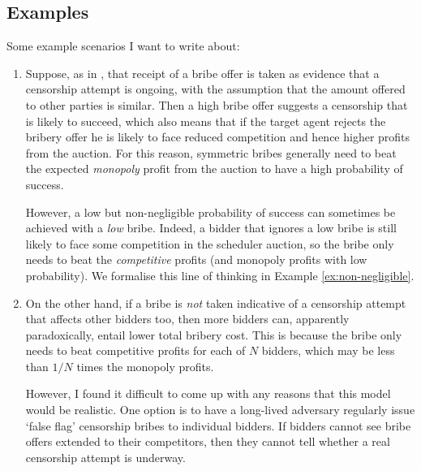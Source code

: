 \subsection{Examples}

Some example scenarios I want to write about:
\begin{enumerate}
  \item
    Suppose, as in \cite{FPR}, that receipt of a bribe offer is taken as evidence that a censorship attempt is ongoing, with the assumption that the amount offered to other parties is similar.
    Then a high bribe offer suggests a censorship that is likely to succeed, which also means that if the target agent rejects the bribery offer he is likely to face reduced competition and hence higher profits from the auction.
    For this reason, symmetric bribes generally need to beat the expected \emph{monopoly} profit from the auction to have a high probability of success.

    However, a low but non-negligible probability of success can sometimes be achieved with a \emph{low} bribe.
    Indeed, a bidder that ignores a low bribe is still likely to face some competition in the scheduler auction, so the bribe only needs to beat the \emph{competitive} profits (and monopoly profits with low probability).
    We formalise this line of thinking in Example \ref{ex:non-negligible}.

  \item
    On the other hand, if a bribe is \emph{not} taken indicative of a censorship attempt that affects other bidders too, then more bidders can, apparently paradoxically, entail lower total bribery cost.
    This is because the bribe only needs to beat competitive profits for each of $N$ bidders, which may be less than $1/N$ times the monopoly profits.

    However, I found it difficult to come up with any reasons that this model would be realistic.
    One option is to have a long-lived adversary regularly issue `false flag' censorship bribes to individual bidders.
    If bidders cannot see bribe offers extended to their competitors, then they cannot tell whether a real censorship attempt is underway.


\end{enumerate}
